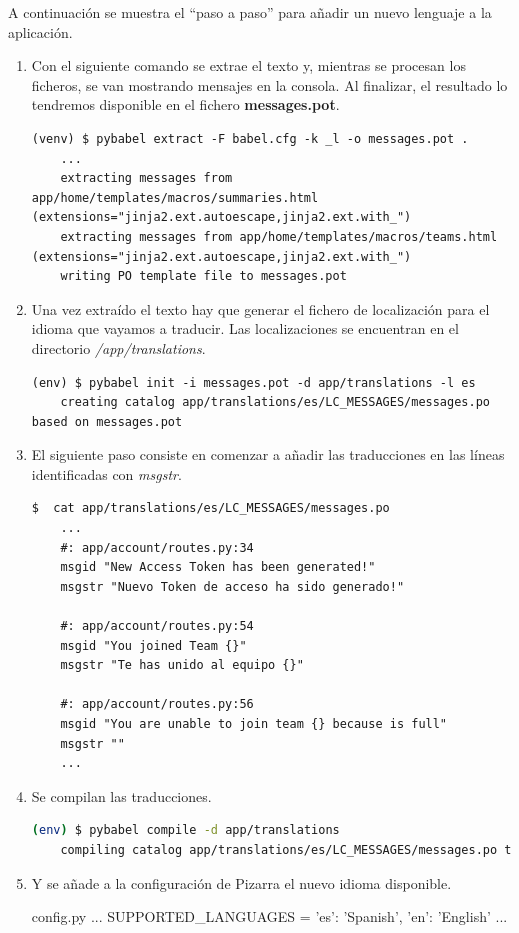 \documentclass[11pt,spanish,listoffigures,listoftables]{tfgetsinf}
\begin{document}
A continuación se muestra el ``paso a paso'' para añadir un nuevo lenguaje a la aplicación.
\begin{enumerate}
    \item Con el siguiente comando se extrae el texto y, mientras se procesan los ficheros, se van mostrando mensajes en la consola. Al finalizar, el resultado lo tendremos disponible en el fichero \mbox{\textbf{messages.pot}}.
	
	\begin{lstlisting}[style=ascii-tree]
	(venv) $ pybabel extract -F babel.cfg -k _l -o messages.pot .
	...
	extracting messages from app/home/templates/macros/summaries.html (extensions="jinja2.ext.autoescape,jinja2.ext.with_")
	extracting messages from app/home/templates/macros/teams.html (extensions="jinja2.ext.autoescape,jinja2.ext.with_")
	writing PO template file to messages.pot
	\end{lstlisting}
	
	\item Una vez extraído el texto hay que generar el fichero de localización para el idioma que vayamos a traducir. Las localizaciones se encuentran en el directorio \textit{/app/translations}. 
	
	\begin{lstlisting}[style=ascii-tree]
	(env) $ pybabel init -i messages.pot -d app/translations -l es
	creating catalog app/translations/es/LC_MESSAGES/messages.po based on messages.pot
	\end{lstlisting}
	
 	\item El siguiente paso consiste en comenzar a añadir las traducciones en las líneas identificadas con \textit{msgstr}.
	
	\begin{lstlisting}[style=ascii-tree]
	$  cat app/translations/es/LC_MESSAGES/messages.po
	...
	#: app/account/routes.py:34
	msgid "New Access Token has been generated!"
	msgstr "Nuevo Token de acceso ha sido generado!"
	
	#: app/account/routes.py:54
	msgid "You joined Team {}"
	msgstr "Te has unido al equipo {}"
	
	#: app/account/routes.py:56
	msgid "You are unable to join team {} because is full"
	msgstr ""
	...
	\end{lstlisting}
	
	\item Se compilan las traducciones.
	
	\begin{lstlisting}[language=bash]
	(env) $ pybabel compile -d app/translations
	compiling catalog app/translations/es/LC_MESSAGES/messages.po to app/translations/es/LC_MESSAGES/messages.mo
	\end{lstlisting}
	
	\item Y se añade a la configuración de Pizarra el nuevo idioma disponible.
	
	\begin{code}{config.py}
		...
		SUPPORTED_LANGUAGES = {'es': 'Spanish', 'en': 'English'}
		...
	\end{code}
	
\end{enumerate}
\end{document}
